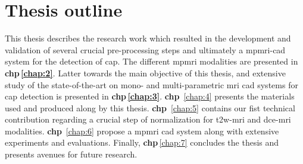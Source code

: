 \section{Thesis outline} \label{sec:intro:outline}

This thesis describes the research work which resulted in the development and validation of several crucial pre-processing steps and ultimately a \ac{mpmri}-\ac{cad} system for the detection of \ac{cap}.
The different \ac{mpmri} modalities are presented in \textbf{\acs{chp}\,\ref{chap:2}}.
Latter towards the main objective of this thesis, and extensive study of the state-of-the-art on mono- and multi-parametric \ac{mri} \ac{cad} systems for \ac{cap} detection is presented in \textbf{\acs{chp}\,\ref{chap:3}}.
\textbf{\acl{chp}}~\ref{chap:4} presents the materials used and produced along by this thesis. 
\textbf{\acl{chp}}~\ref{chap:5} contains our fist technical contribution regarding a crucial step of normalization for \ac{t2w}-\ac{mri} and \ac{dce}-\ac{mri} modalities.
\textbf{\acl{chp}}~\ref{chap:6} propose a \ac{mpmri} \ac{cad} system along with extensive experiments and evaluations.
Finally, \textbf{\acs{chp}}\,\ref{chap:7} concludes the thesis and presents avenues for future research.
